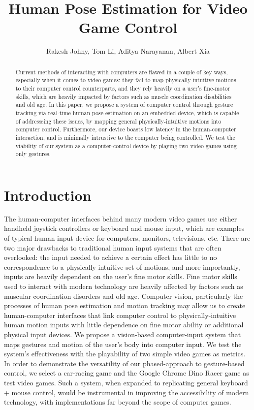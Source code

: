 \documentclass[10pt,twocolumn,letterpaper]{article}
\begin{document}
\title{Human Pose Estimation for Video Game Control}
\author{Rakesh Johny, Tom Li, Aditya Narayanan, Albert Xia}
\maketitle

\begin{abstract}
    Current methods of interacting with computers are flawed in a 
    couple of key ways, especially when it comes to video games: they fail to map physically-intuitive motions to their computer 
    control counterparts, and they rely heavily on a user's fine-motor skills, 
    which are heavily impacted by factors such as muscle coordination disabilities 
    and old age. In this paper, we propose a system of computer control through 
    gesture tracking via real-time human pose estimation on an embedded device, 
    which is capable of addresssing these issues, by mapping general physically-intuitive 
    motions into computer control. Furthermore, our device boasts low latency in 
    the human-computer interaction, and is minimally intrustive to the computer being 
    controlled. We test the viability of our system as a computer-control device by playing two 
    video games using only gestures.
\end{abstract}

\section{Introduction}
The human-computer interfaces behind many modern video games use either handheld 
joystick controllers or keyboard and mouse input, which are examples
of typical human input device for computers, monitors, televisions, etc. There are two 
major drawbacks to traditional human input systems that are often overlooked: the input needed 
to achieve a certain effect has little to no correspondence to a physically-intuitive set 
of motions, and more importantly, inputs are heavily dependent on the user's fine motor skills. 
Fine motor skills used to interact with modern technology are heavily affected by factors such 
as muscular coordination disorders and old age. Computer vision, particularly the processes 
of human pose estimation and motion tracking may allow us to create human-computer interfaces 
that link computer control to physically-intuitive human motion inputs with little dependence on 
fine motor ability or additional physical input devices. We propose a vision-based computer-input 
system that maps gestures and motion of the user's body into computer input. We test the system's 
effectiveness with the playability of two simple video games as metrics. In order to demonstrate 
the versatility of our phased-approach to gesture-based control, we select a car-racing game and 
the Google Chrome Dino Racer game as test video games. Such a system, when expanded to replicating 
general keyboard + mouse control, would be instrumental in improving the accessibility of 
modern technology, with implementations far beyond the scope of computer games.
\end{document}
